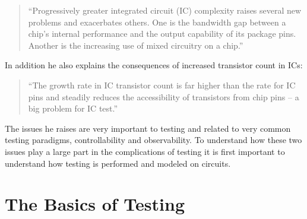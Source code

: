 \documentclass[12pt]{report}
\begin{document}
\begin{quote}
``Progressively greater integrated circuit (IC) complexity raises several new problems and exacerbates others.  One is the bandwidth gap between a chip's internal performance and the output capability of its package pins.  Another is the increasing use of mixed circuitry on a chip.\cite{zorian}''
\end{quote}
In addition he also explains the consequences of increased transistor count in ICs:
\begin{quote}
``The growth rate in IC transistor count is far higher than the rate for IC pins and steadily reduces the accessibility of transistors from chip pins -- a big problem for IC test.\cite{zorian}''
\end{quote}

The issues he raises are very important to testing and related to very common testing paradigms, controllability and observability.  To understand how these two issues play a large part in the complications of testing it is first important to understand how testing is performed and modeled on circuits.

\section{The Basics of Testing}
\end{document}
